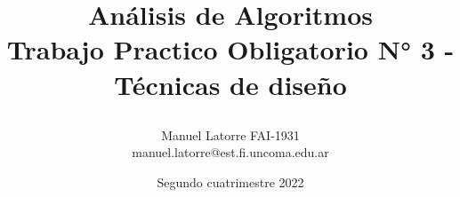 \titlepage

\title{\textbf{Análisis de Algoritmos}\\
\large{\textbf{Trabajo Practico Obligatorio N° 3 - Técnicas de diseño}}
\author{
Manuel Latorre FAI-1931\\ manuel.latorre@est.fi.uncoma.edu.ar\vspace{3mm}\\
}}
\date{Segundo cuatrimestre 2022}

\maketitle
\vspace{25mm}
\vfill
{}

\thispagestyle{empty}
\titlepage
\newpage
\tableofcontents %
\newpage
\pagestyle{plain}
\thispagestyle{plain}
\pagebreak